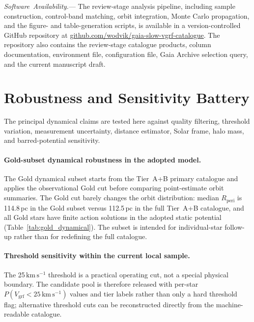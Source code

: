 \documentclass{aa}  %
\newcommand{\availabilitynote}[1]{\par\vspace{1.5ex}\noindent\mbox{{\small\itshape #1.}}---\ignorespaces}
\newcommand{\vgrf}{\ensuremath{V_{\mathrm{grf}}}\xspace}
\newcommand{\kms}{\ensuremath{\,\mathrm{km\,s^{-1}}}\xspace}
\newcommand{\Rperi}{R_{\mathrm{peri}}}
\begin{document}
\availabilitynote{Software Availability}
The review-stage analysis pipeline, including sample construction,
control-band matching, orbit integration, Monte Carlo propagation, and
the figure- and table-generation scripts, is available in a
version-controlled GitHub repository at
\href{https://github.com/wodvik/gaia-slow-vgrf-catalogue}{github.com/wodvik/gaia-slow-vgrf-catalogue}.
The repository also contains the review-stage catalogue products, column
documentation, environment file, configuration file, Gaia Archive
selection query, and the current manuscript draft.

\appendix

\section{Robustness and Sensitivity Battery} \label{app:sensitivity}

The principal dynamical claims are tested here against quality filtering,
threshold variation, measurement uncertainty, distance estimator, Solar
frame, halo mass, and barred-potential sensitivity.

\paragraph{Gold-subset dynamical robustness in the adopted model.}
The Gold dynamical subset starts from the Tier~A+B primary catalogue and
applies the observational Gold cut before comparing point-estimate orbit
summaries.  The Gold cut barely changes the orbit distribution: median
$\Rperi$ is 114.8\,pc in the Gold subset versus 112.5\,pc in the full
Tier~A+B catalogue, and all Gold stars have finite action solutions in
the adopted static potential (Table~\ref{tab:gold_dynamical}).  The subset is intended for individual-star
follow-up rather than for redefining the full catalogue.



\paragraph{Threshold sensitivity within the current local sample.}
The 25\kms threshold is a practical operating cut, not a special physical
boundary.  The candidate pool is therefore released with
per-star $P(\vgrf<25\kms)$ values and tier labels rather than only a hard
threshold flag; alternative threshold cuts can be reconstructed directly
from the machine-readable catalogue.
\end{document}
